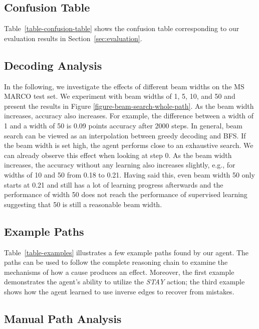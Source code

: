 

\subsection{Confusion Table}
Table~\ref{table-confusion-table} shows the confusion table corresponding to our evaluation results in Section~\ref{sec:evaluation}.


\subsection{Decoding Analysis}
\label{sec:decoding-analysis}

In the following, we investigate the effects of different beam widths on the MS MARCO test set. We experiment with beam widths of 1, 5, 10, and 50 and present the results in Figure \ref{figure-beam-search-whole-path}. As the beam width increases, accuracy also increases. For example, the difference between a width of 1 and a width of 50 is 0.09 points accuracy after 2000 steps. In general, beam search can be viewed as an interpolation between greedy decoding and BFS. If the beam width is set high, the agent performs close to an exhaustive search. We can already observe this effect when looking at step 0. As the beam width increases, the accuracy without any learning also increases slightly, e.g., for widths of 10 and 50 from 0.18 to 0.21. Having said this, even beam width 50 only starts at 0.21 and still has a lot of learning progress afterwards and the performance of width 50 does not reach the performance of supervised learning suggesting that 50 is still a reasonable beam width.





\subsection{Example Paths}

Table~\ref{table-examples} illustrates a few example paths found by our agent. The paths can be used to follow the complete reasoning chain to examine the mechanisms of how a cause produces an effect. Moreover, the first example demonstrates the agent's ability to utilize the \textit{STAY} action; the third example shows how the agent learned to use inverse edges to recover from mistakes.

\subsection{Manual Path Analysis}
\label{sec:manual-analysis}

